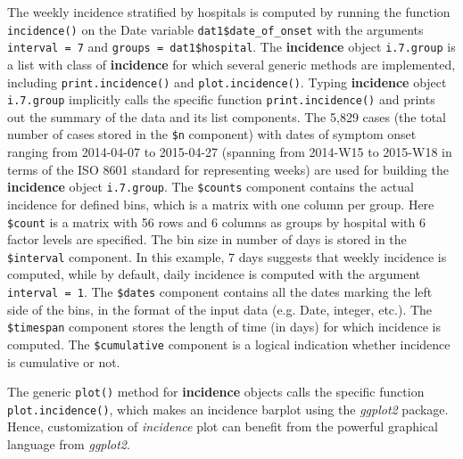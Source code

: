 \documentclass[9pt,a4paper]{extarticle}
\newenvironment{Shaded}{\begin{snugshade}}{\end{snugshade}}
\newcommand{\CommentTok}[1]{\textcolor[rgb]{0.56,0.35,0.01}{\textit{#1}}}
\newcommand{\DataTypeTok}[1]{\textcolor[rgb]{0.13,0.29,0.53}{#1}}
\newcommand{\KeywordTok}[1]{\textcolor[rgb]{0.13,0.29,0.53}{\textbf{#1}}}
\newcommand{\NormalTok}[1]{#1}
\newcommand{\OperatorTok}[1]{\textcolor[rgb]{0.81,0.36,0.00}{\textbf{#1}}}
\newcommand{\StringTok}[1]{\textcolor[rgb]{0.31,0.60,0.02}{#1}}
\begin{document}
The weekly incidence stratified by hospitals is computed by running the function \texttt{incidence()} on the Date variable \texttt{dat1\$date\_of\_onset} with the arguments \texttt{interval = 7} and \texttt{groups = dat1\$hospital}.
The \textbf{incidence} object \texttt{i.7.group} is a list with class of \textbf{incidence} for which several generic methods are implemented, including \texttt{\texttt{print.incidence()}} and \texttt{plot.incidence()}.
Typing \textbf{incidence} object \texttt{i.7.group} implicitly calls the specific function \texttt{print.incidence()} and prints out the summary of the data and its list components.
The 5,829 cases (the total number of cases stored in the \texttt{\$n} component) with dates of symptom onset ranging from 2014-04-07 to 2015-04-27 (spanning from 2014-W15 to 2015-W18 in terms of the ISO 8601 standard for representing weeks) are used for building the \textbf{incidence} object \texttt{i.7.group}.
The \texttt{\$counts} component contains the actual incidence for defined bins, which is a matrix with one column per group.
Here \texttt{\$count} is a matrix with 56 rows and 6 columns as groups by hospital with 6 factor levels are specified.
The bin size in number of days is stored in the \texttt{\$interval} component.
In this example, 7 days suggests that weekly incidence is computed, while by default, daily incidence is computed with the argument \texttt{interval = 1}.
The \texttt{\$dates} component contains all the dates marking the left side of the bins, in the format of the input data (e.g. Date, integer, etc.).
The \texttt{\$timespan} component stores the length of time (in days) for which incidence is computed.
The \texttt{\$cumulative} component is a logical indication whether incidence is cumulative or not.

The generic \texttt{plot()} method for \textbf{incidence} objects calls the specific function \texttt{plot.incidence()}, which makes an incidence barplot using the \textit{ggplot2} package.
Hence, customization of \emph{incidence} plot can benefit from the powerful graphical language from \textit{ggplot2}.

\begin{Shaded}
\end{Shaded}
\end{document}
